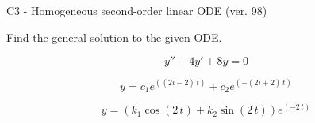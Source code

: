 \begin{exercise}
  \begin{exerciseTitle}C3 - Homogeneous second-order linear ODE (ver. 98)\end{exerciseTitle}
  \begin{exerciseStatement}
    
Find the general solution to the given ODE.

    
\[y''+4y'+8y = 0\]

  \end{exerciseStatement}
  \begin{exerciseAnswer}
    
\[y= c_{1} e^{\left(\left(2 i - 2\right) \, t\right)} + c_{2} e^{\left(-\left(2 i + 2\right) \, t\right)}\]

    
\[y= {\left(k_{1} \cos\left(2 \, t\right) + k_{2} \sin\left(2 \, t\right)\right)} e^{\left(-2 \, t\right)}\]

  \end{exerciseAnswer}
\end{exercise}